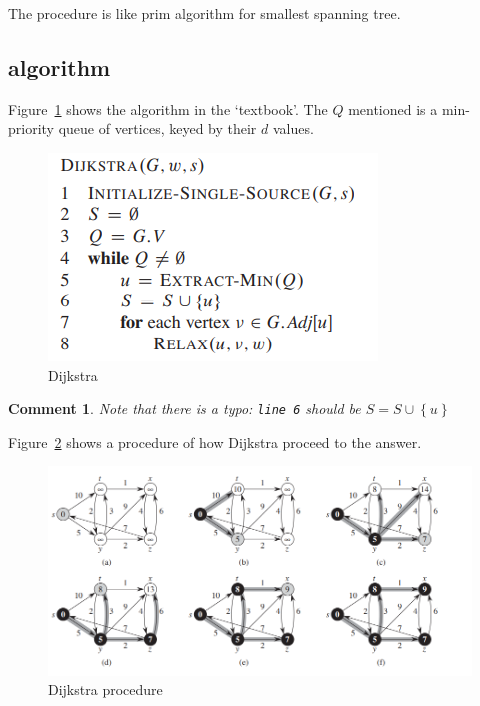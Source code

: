 \documentclass[a4paper, 10pt]{ctexart} %
\newtheorem{corollary}{Comment}
\begin{document}
The procedure is like prim algorithm for 
smallest spanning tree. 
\subsection{algorithm}
Figure~\ref{fig:Dijkstra} shows the algorithm
in the `textbook'. The $Q$ mentioned is a 
min-priority queue of vertices, keyed by their
$d$ values.
\begin{figure}[]
    \centering
    \includegraphics[scale = 0.7]{sssp7.png}
    \caption{Dijkstra}
    \label{fig:Dijkstra}
\end{figure}
\begin{corollary}
Note that 
there is a typo:
\verb|line 6| should be $S = S \cup \left\{u\right\}$
\end{corollary}
Figure~\ref{fig:dij procedure} shows a procedure 
of how Dijkstra proceed to the answer. 
\begin{figure}[]
    \centering
    \includegraphics[scale = 0.7]{sssp8.png}
    \caption{Dijkstra procedure}
    \label{fig:dij procedure}
\end{figure}
\end{document}

